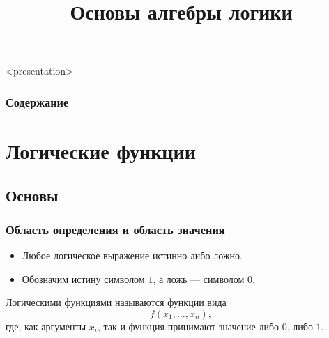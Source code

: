 


\title[Основы алгебры логики]{Основы алгебры логики}

\newcommand{\MyLand}{\cdot}




\begin{frame}<presentation>
    \frametitle{Содержание}
    \tableofcontents
\end{frame}


\section{Логические функции}


\subsection{Основы}

\begin{frame}
    \frametitle{Область определения и область значения}
    
    \begin{itemize}
        \item Любое логическое выражение \alert{истинно} либо \alert{ложно}.
        \item Обозначим истину символом $1$, а ложь --- символом $0$.
    \end{itemize}

    \alert{Логическими функциями} называются функции вида 
    \[
        f(x_1,\ldots,x_n),
    \]
    где, как аргументы $x_i$, так и функция принимают значение либо $0$, либо $1$.
\end{frame} 


